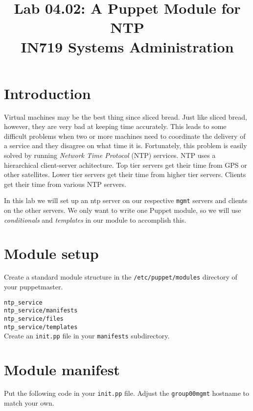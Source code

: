 \documentclass{article}   	%
\title{Lab 04.02: A Puppet Module for NTP \\ IN719 Systems Administration}
\date{}							%
\begin{document}
\maketitle

\section*{Introduction}
Virtual machines may be the best thing since sliced bread. Just like sliced bread, however, they are very bad at keeping time accurately. This leads to some difficult problems when two or more machines need to coordinate the delivery of a service and they disagree on what time it is. Fortunately, this problem is easily solved by running \emph{Network Time Protocol} (NTP) services. NTP uses a hierarchical client-server achitecture. Top tier servers get their time from GPS or other satellites. Lower tier servers get their time from higher tier servers. Clients get their time from various NTP servers.

In this lab we will set up an ntp server on our respective \texttt{mgmt} servers and clients on the other servers. We only want to write one Puppet module, so we will use \emph{conditionals} and \emph{templates} in our module to accomplish this.

\section{Module setup}
Create a standard module structure in the \texttt{/etc/puppet/modules} directory of your puppetmaster.

\texttt{ntp\_service} \\
\texttt{ntp\_service/manifests} \\
\texttt{ntp\_service/files} \\
\texttt{ntp\_service/templates} \\

Create an \texttt{init.pp} file in your \texttt{manifests} subdirectory.

\section{Module manifest}
Put the following code in your \texttt{init.pp} file.  Adjust the \texttt{group00mgmt} hostname to match your own.
\end{document}
